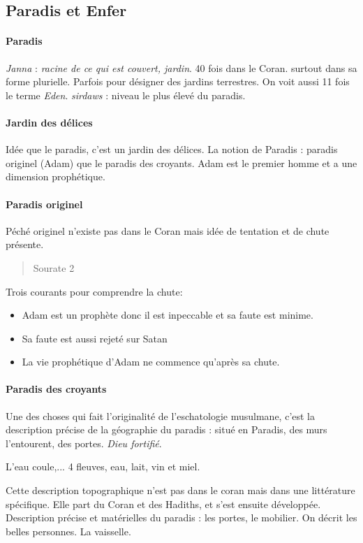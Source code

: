 \subsection{Paradis et Enfer}
\paragraph{Paradis} \textit{Janna} : \textit{racine de ce qui est couvert, jardin}. 40 fois dans le Coran. surtout dans sa forme plurielle. Parfois pour désigner des jardins terrestres. On voit aussi 11 fois le terme \textit{Eden}. \textit{sirdaws} : niveau le plus élevé du paradis.

\paragraph{Jardin des délices} Idée que le paradis, c'est un jardin des délices. La notion de Paradis : paradis originel (Adam) que le paradis des croyants.
Adam est le premier homme et a une dimension prophétique.

\paragraph{Paradis originel } Péché originel n'existe pas dans le Coran mais idée de tentation et de chute présente. 
\begin{quote}
    Sourate 2
\end{quote}

Trois courants pour comprendre la chute: 
\begin{itemize}
    \item Adam est un prophète donc il est inpeccable et sa faute est minime. 
    \item Sa faute est aussi rejeté sur Satan
    \item La vie prophétique d'Adam ne commence qu'après sa chute.
\end{itemize}

\paragraph{Paradis des croyants} Une des choses qui fait l'originalité de l'eschatologie musulmane, c'est la description précise de la géographie du paradis : situé en Paradis, des murs l'entourent, des portes. \textit{Dieu fortifié}.
\begin{Ex}
    L'eau coule,... 4 fleuves, eau, lait, vin et miel.
\end{Ex} 
Cette description topographique n'est pas dans le coran mais dans une littérature spécifique. Elle part du Coran et des Hadiths, et s'est ensuite développée. Description précise et matérielles du paradis : les portes, le mobilier. On décrit les belles personnes. La vaisselle. 

